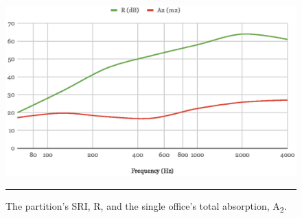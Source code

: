\begin{figure}[htbp]
	\centering
	\includegraphics[width=\textwidth]{figures/R+A2.eps}
	\rule{\textwidth}{0.5pt} %
	\caption{The partition's SRI, R, and the single office's total absorption, A\textsubscript{2}.}
	\label{fig:R+A2}
\end{figure}